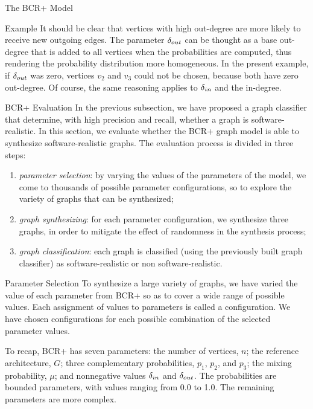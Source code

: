 \documentclass[11pt,twocolumn,a4paper,english]{article}
\begin{document}
\begin{section}{The BCR+ Model}
\begin{subsection}{Example}
	It should be clear that vertices with high out-degree are more likely to receive new outgoing edges. The parameter $\delta_{out}$ can be thought as a base out-degree that is added to all vertices when the probabilities are computed, thus rendering the probability distribution more homogeneous. In the present example, if $\delta_{out}$ was zero, vertices $v_2$ and $v_3$ could not be chosen, because both have zero out-degree. Of course, the same reasoning applies to $\delta_{in}$ and the in-degree.

\end{subsection}
	
\begin{subsection}{BCR+ Evaluation}
	In the previous subsection, we have proposed a graph classifier that determine, with high precision and recall, whether a graph is software-realistic. In this section, we evaluate whether the BCR+ graph model is able to synthesize software-realistic graphs. The evaluation process is divided in three steps:
	
	\begin{enumerate}
		\item \emph{parameter selection}: by varying the values of the parameters of the model, we come to thousands of possible parameter configurations, so to explore the variety of graphs that can be synthesized;
		
		\item \emph{graph synthesizing}: for each parameter configuration, we synthesize three graphs, in order to mitigate the effect of randomness in the synthesis process;
		
		\item \emph{graph classification}: each graph is classified (using the previously built graph classifier) as software-realistic or non software-realistic.
	\end{enumerate}
	
\begin{subsubsection}{Parameter Selection}
	To synthesize a large variety of graphs, we have varied the value of each parameter from BCR+ so as to cover a wide range of possible values. Each assignment of values to parameters is called a configuration. We have chosen configurations for each possible combination of the selected parameter values.
		
	To recap, BCR+ has seven parameters: the number of vertices, $n$; the reference architecture, $G$; three complementary probabilities, $p_1$, $p_2$, and $p_3$; the mixing probability, $\mu$; and nonnegative values $\delta_{in}$ and $\delta_{out}$. The probabilities are bounded parameters, with values ranging from 0.0 to 1.0. The remaining parameters are more complex.
	

\end{subsubsection}
\end{subsection}
\end{section}
\end{document}
